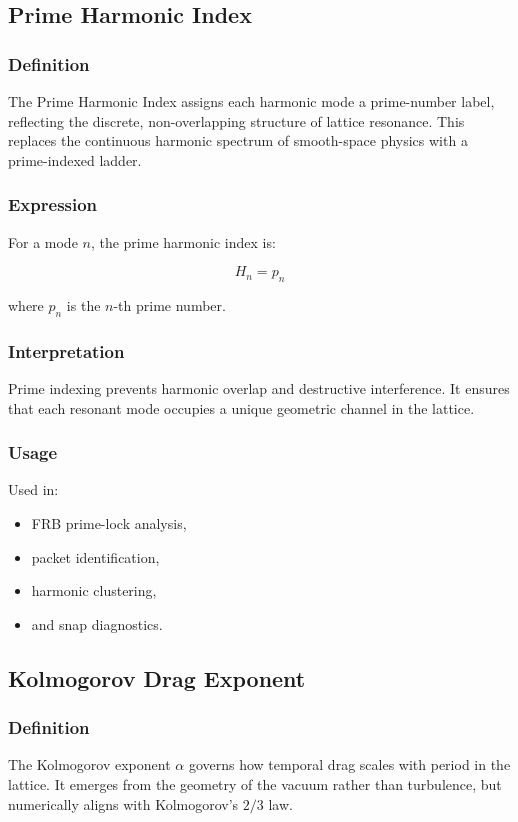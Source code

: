 \documentclass[12pt,oneside]{book}
\begin{document}
\subsection{Prime Harmonic Index}

\subsubsection{Definition}
The Prime Harmonic Index assigns each harmonic mode a prime-number label, reflecting the
discrete, non-overlapping structure of lattice resonance. This replaces the continuous harmonic
spectrum of smooth-space physics with a prime-indexed ladder.

\subsubsection{Expression}
For a mode $n$, the prime harmonic index is:


\[
H_n = p_n
\]


where $p_n$ is the $n$-th prime number.

\subsubsection{Interpretation}
Prime indexing prevents harmonic overlap and destructive interference.  
It ensures that each resonant mode occupies a unique geometric channel in the lattice.

\subsubsection{Usage}
Used in:
\begin{itemize}
    \item FRB prime-lock analysis,
    \item packet identification,
    \item harmonic clustering,
    \item and snap diagnostics.
\end{itemize}


\subsection{Kolmogorov Drag Exponent}

\subsubsection{Definition}
The Kolmogorov exponent $\alpha$ governs how temporal drag scales with period in the lattice.
It emerges from the geometry of the vacuum rather than turbulence, but numerically aligns with
Kolmogorov’s $2/3$ law.
\end{document}
